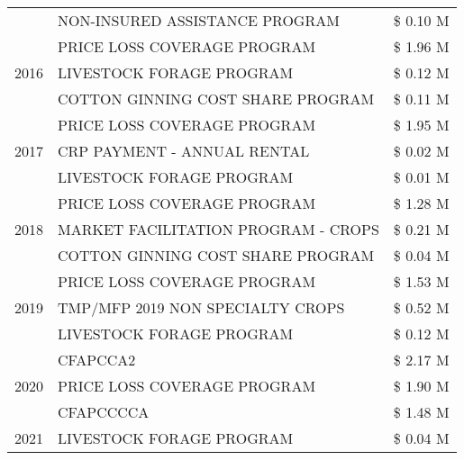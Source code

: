 \begin{tabular}{llr}
 & NON-INSURED ASSISTANCE PROGRAM & \$ 0.10 M \\
\cline{1-3}
\multirow[t]{3}{*}{2016} & PRICE LOSS COVERAGE PROGRAM & \$ 1.96 M \\
 & LIVESTOCK FORAGE PROGRAM & \$ 0.12 M \\
 & COTTON GINNING COST SHARE PROGRAM & \$ 0.11 M \\
\cline{1-3}
\multirow[t]{3}{*}{2017} & PRICE LOSS COVERAGE PROGRAM & \$ 1.95 M \\
 & CRP PAYMENT - ANNUAL RENTAL & \$ 0.02 M \\
 & LIVESTOCK FORAGE PROGRAM & \$ 0.01 M \\
\cline{1-3}
\multirow[t]{3}{*}{2018} & PRICE LOSS COVERAGE PROGRAM & \$ 1.28 M \\
 & MARKET FACILITATION PROGRAM - CROPS & \$ 0.21 M \\
 & COTTON GINNING COST SHARE PROGRAM & \$ 0.04 M \\
\cline{1-3}
\multirow[t]{3}{*}{2019} & PRICE LOSS COVERAGE PROGRAM & \$ 1.53 M \\
 & TMP/MFP 2019 NON SPECIALTY CROPS & \$ 0.52 M \\
 & LIVESTOCK FORAGE PROGRAM & \$ 0.12 M \\
\cline{1-3}
\multirow[t]{3}{*}{2020} & CFAPCCA2 & \$ 2.17 M \\
 & PRICE LOSS COVERAGE PROGRAM & \$ 1.90 M \\
 & CFAPCCCCA & \$ 1.48 M \\
\cline{1-3}
2021 & LIVESTOCK FORAGE PROGRAM & \$ 0.04 M \\
\cline{1-3}
\bottomrule
\end{tabular}
